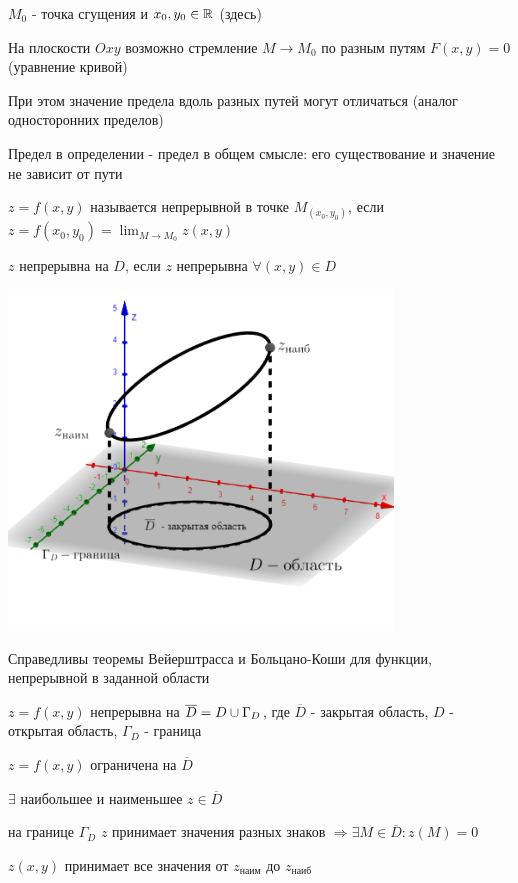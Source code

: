\documentclass[12pt]{article}
\begin{document}
    $M_0$ - точка сгущения и $x_0, y_0 \in \mathbb{R}$ (здесь)

    \Nota На плоскости $Oxy$ возможно стремление $M \rightarrow M_0$ по разным путям $F(x, y) = 0$ (уравнение кривой)

    При этом значение предела вдоль разных путей могут отличаться (аналог односторонних пределов)

    Предел в определении - предел в общем смысле: его существование и значение не зависит от пути

    \Def $z = f(x, y)$ называется непрерывной в точке $M_(x_0, y_0)$, если $z = f(x_0, y_0) = \lim_{M \to M_0} z(x, y)$

    $z$ непрерывна на $D$, если $z$ непрерывна $\forall (x, y) \in D$

    \includegraphics[height=90mm]{calculus/images/calculus_2024_02_28_3}

    \Nota Справедливы теоремы Вейерштрасса и Больцано-Коши для функции, непрерывной в заданной области

    $z = f(x, y)$ непрерывна на $\overline{D} = D \cup \Gamma_D$, где $\overline{D}$ - закрытая область, $D$ - открытая область, $\Gamma_D$ - граница

     $z = f(x, y)$ ограничена на $\overline{D}$

     $\exists$ наибольшее и наименьшее $z \in \overline{D}$

     на границе $\Gamma_D$ $z$ принимает значения разных знаков $\Longrightarrow \exists M \in \overline{D} : z(M) = 0$

     $z(x, y)$ принимает все значения от $z_{\text{наим}}$ до $z_{\text{наиб}}$ \\[1\baselineskip]
\end{document}
